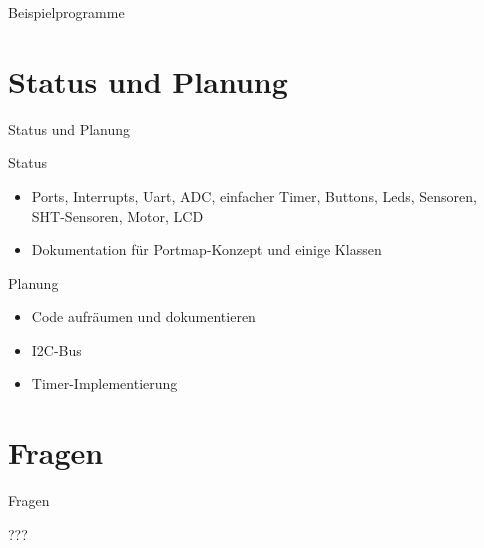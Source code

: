 \documentclass[11pt]{beamer}
\begin{document}
\begin{frame}[fragile]{Beispielprogramme}
~~
\end{frame}


\section{Status und Planung}
\begin{frame}[fragile]{Status und Planung}

\begin{block}{Status}
\begin{itemize}
	\item Ports, Interrupts, Uart, ADC, einfacher Timer, Buttons, Leds, Sensoren, SHT-Sensoren, Motor, LCD
	\item Dokumentation für Portmap-Konzept und einige Klassen
\end{itemize}
\end{block}

\begin{block}{Planung}
 \begin{itemize}
	\item Code aufräumen und dokumentieren
	\item I2C-Bus
	\item Timer-Implementierung
\end{itemize}
\end{block}

\end{frame}


\section{Fragen}
\begin{frame}[fragile]{Fragen}
\begin{center}
\begin{Huge}\begin{Huge}???\end{Huge}\end{Huge}\end{center}
\end{frame}
\end{document}
